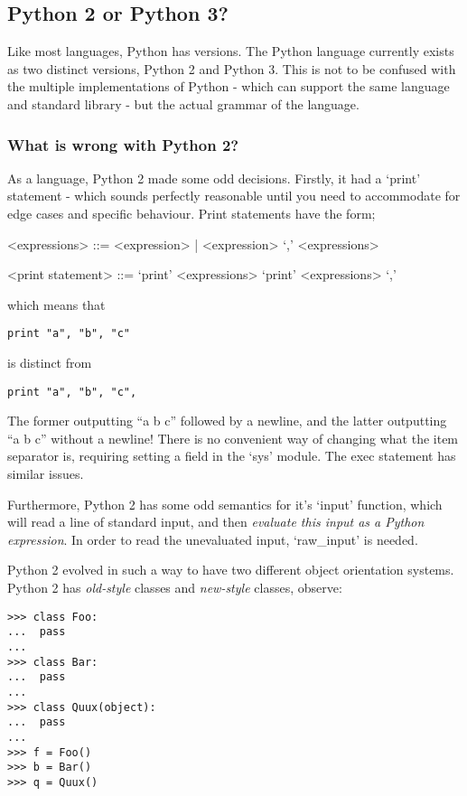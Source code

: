 \documentclass[10pt,a4paper,notitlepage]{report}
\begin{document}
\subsection{Python 2 or Python 3?}
Like most languages, Python has versions. The Python language currently exists as two distinct versions, Python 2 and Python 3. This is not to be confused with the multiple implementations of Python - which can support the same language and standard library - but the actual grammar of the language.

\subsubsection{What is wrong with Python 2?}
As a language, Python 2 made some odd decisions. Firstly, it had a `print' statement - which sounds perfectly reasonable until you need to accommodate for edge cases and specific behaviour. Print statements have the form;
\begin{grammar}
<expressions> ::= <expression> | <expression> `,' <expressions>

<print statement> ::= `print' <expressions>
\alt `print' <expressions> `,'
\end{grammar}

which means that
\begin{lstlisting}[language={[2]Python}]
print "a", "b", "c"
\end{lstlisting}

is distinct from
\begin{lstlisting}[language={[2]Python}]
print "a", "b", "c",
\end{lstlisting}

The former outputting ``a b c'' followed by a newline, and the latter outputting ``a b c'' without a newline! There is no convenient way of changing what the item separator is, requiring setting a field in the `sys' module. The exec statement has similar issues.

Furthermore, Python 2 has some odd semantics for it's `input' function, which will read a line of standard input, and then \emph{evaluate this input as a Python expression}. In order to read the unevaluated input, `raw_input' is needed.

Python 2 evolved in such a way to have two different object orientation systems. Python 2 has \emph{old-style} classes and \emph{new-style} classes, observe:

\begin{lstlisting}[language={[2]Python}]
>>> class Foo:
...  pass
... 
>>> class Bar:
...  pass
... 
>>> class Quux(object):
...  pass
... 
>>> f = Foo()
>>> b = Bar()
>>> q = Quux()
\end{lstlisting}
\end{document}
